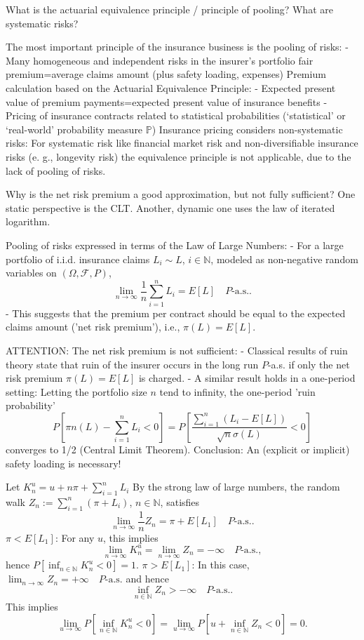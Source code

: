 What is the actuarial equivalence principle / principle of pooling? 
What are systematic risks?


The most important principle of the insurance business is the pooling of risks:
- Many homogeneous and independent risks in the insurer’s portfolio
  fair premium=average claims amount (plus safety loading, expenses)
Premium calculation based on the Actuarial Equivalence Principle:
- Expected present value of premium payments=expected present value of insurance benefits
- Pricing of insurance contracts related to statistical probabilities (‘statistical’ or ‘real-world’ probability measure \( \mathbb{P}\))
Insurance pricing considers non-systematic risks:
For systematic risk like financial market risk and non-diversifiable insurance risks (e. g., longevity risk) the
equivalence principle is not applicable, due to the lack of pooling of risks.

Why is the net risk premium a good approximation, but not fully sufficient? One
static perspective is the CLT. Another, dynamic one uses the law of iterated logarithm.

Pooling of risks expressed in terms of the Law of Large Numbers:
- For a large portfolio of i.i.d. insurance claims \(L_i \sim L\), \(i \in \mathbb{N}\), 
   modeled as non-negative random variables on \((\Omega, \mathcal{F}, P)\),
  \[\lim_{n \rightarrow \infty} \frac{1}{n} \sum_{i=1}^n L_i = E[L] \quad P\text{-a.s..}\]
- This suggests that the premium per contract should be equal to the expected claims amount ('net risk premium'), i.e., \(\pi(L) = E[L]\).

ATTENTION: The net risk premium is not sufficient:
- Classical results of ruin theory state that ruin of the insurer occurs in the long run \(P\)-a.s. if only the net risk premium \(\pi(L) = E[L]\) is charged.
- A similar result holds in a one-period setting: Letting the portfolio size \(n\) tend to infinity, the one-period 'ruin probability'
\[P \left[ \pi n(L) - \sum_{i=1}^n L_i < 0 \right] = P \left[ \frac{\sum_{i=1}^n (L_i - E[L])}{\sqrt{n} \sigma(L)} < 0 \right]\]
converges to 1/2 (Central Limit Theorem).
Conclusion: An (explicit or implicit) safety loading is necessary!

Let \(K^u_n = u + n\pi + \sum_{i=1}^n L_i\)
By the strong law of large numbers, the random walk \(Z_n := \sum_{i=1}^n (\pi + L_i)\), \(n \in \mathbb{N}\), satisfies
\[\lim_{n \rightarrow \infty} \frac{1}{n} Z_n = \pi + E[L_1] \quad P\text{-a.s..}\]
\(\pi < E[L_1]\): For any \(u\), this implies
\[\lim_{n \rightarrow \infty} K_n^u = \lim_{n \rightarrow \infty} Z_n = -\infty \quad P\text{-a.s.},\]
hence \(P[\inf_{n \in \mathbb{N}} K_n^u < 0] = 1\).
\(\pi > E[L_1]\): In this case, \(\lim_{n \rightarrow \infty} Z_n = +\infty \quad P\text{-a.s.}\) and hence
\[\inf_{n \in \mathbb{N}} Z_n > -\infty \quad P\text{-a.s..}\]
This implies
\[\lim_{u \rightarrow \infty} P[\inf_{n \in \mathbb{N}} K_n^u < 0] = \lim_{u \rightarrow \infty} P[u + \inf_{n \in \mathbb{N}} Z_n < 0] = 0.\]

